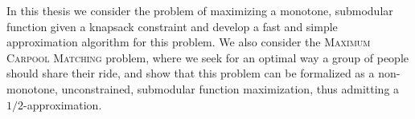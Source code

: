 In this thesis we consider the problem of maximizing a monotone, submodular function given a knapsack constraint and develop a fast and simple approximation algorithm for this problem.
We also consider the \textsc{Maximum Carpool Matching} problem, where we seek for an optimal way a group of people should share their ride, and show that this problem can be formalized as a non-monotone, unconstrained, submodular function maximization, thus admitting a $1/2$-approximation.